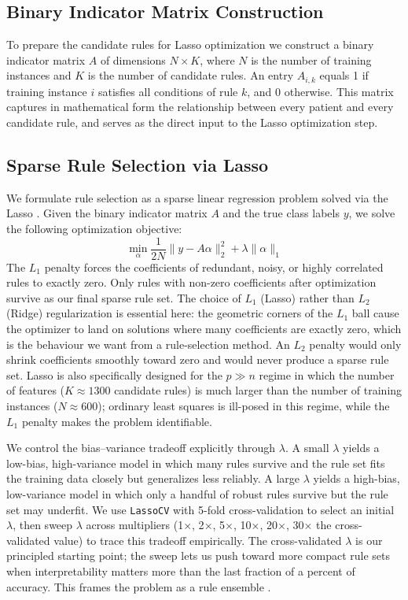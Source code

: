 \documentclass[11pt]{article}
\begin{document}
\subsection{Binary Indicator Matrix Construction}

To prepare the candidate rules for Lasso optimization we construct a binary indicator matrix $A$ of dimensions $N \times K$, where $N$ is the number of training instances and $K$ is the number of candidate rules. An entry $A_{i,k}$ equals 1 if training instance $i$ satisfies all conditions of rule $k$, and 0 otherwise. This matrix captures in mathematical form the relationship between every patient and every candidate rule, and serves as the direct input to the Lasso optimization step.

\subsection{Sparse Rule Selection via Lasso}

We formulate rule selection as a sparse linear regression problem solved via the Lasso \citep{tibshirani1996lasso}. Given the binary indicator matrix $A$ and the true class labels $y$, we solve the following optimization objective:
\begin{equation}
\min_{\alpha} \frac{1}{2N} \| y - A\alpha \|_2^2 + \lambda \| \alpha \|_1
\end{equation}
The $L_1$ penalty forces the coefficients of redundant, noisy, or highly correlated rules to exactly zero. Only rules with non-zero coefficients after optimization survive as our final sparse rule set. The choice of $L_1$ (Lasso) rather than $L_2$ (Ridge) regularization is essential here: the geometric corners of the $L_1$ ball cause the optimizer to land on solutions where many coefficients are exactly zero, which is the behaviour we want from a rule-selection method. An $L_2$ penalty would only shrink coefficients smoothly toward zero and would never produce a sparse rule set. Lasso is also specifically designed for the $p \gg n$ regime in which the number of features ($K \approx 1300$ candidate rules) is much larger than the number of training instances ($N \approx 600$); ordinary least squares is ill-posed in this regime, while the $L_1$ penalty makes the problem identifiable.

We control the bias--variance tradeoff explicitly through $\lambda$. A small $\lambda$ yields a low-bias, high-variance model in which many rules survive and the rule set fits the training data closely but generalizes less reliably. A large $\lambda$ yields a high-bias, low-variance model in which only a handful of robust rules survive but the rule set may underfit. We use \texttt{LassoCV} with 5-fold cross-validation to select an initial $\lambda$, then sweep $\lambda$ across multipliers (1$\times$, 2$\times$, 5$\times$, 10$\times$, 20$\times$, 30$\times$ the cross-validated value) to trace this tradeoff empirically. The cross-validated $\lambda$ is our principled starting point; the sweep lets us push toward more compact rule sets when interpretability matters more than the last fraction of a percent of accuracy. This frames the problem as a rule ensemble \citep{friedman2008rule}.
\end{document}
